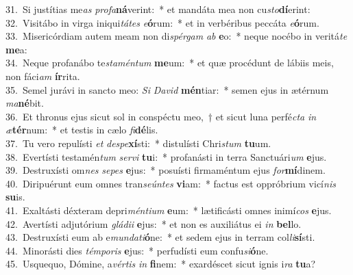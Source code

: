 {31.~}Si justítias me\textit{as} \textit{pro}\textit{fa}\textbf{ná}verint:~* et mandáta mea non cu\textit{sto}\textbf{dí}erint:\\
{32.~}Visitábo in virga iniqui\textit{tá}\textit{tes} \textit{e}\textbf{ó}rum:~* et in verbéribus peccáta \textit{e}\textbf{ó}rum.\\
{33.~}Misericórdiam autem meam non di\textit{spér}\textit{gam} \textit{ab} \textbf{e}o:~* neque nocébo in veritá\textit{te} \textbf{me}a:\\
{34.~}Neque profanábo te\textit{sta}\textit{mén}\textit{tum} \textbf{me}um:~* et quæ procédunt de lábiis meis, non fáci\textit{am} \textbf{ír}rita.\\
{35.~}Semel jurávi in sancto meo: \textit{Si} \textit{Da}\textit{vid} \textbf{mén}tiar:~* semen ejus in ætérnum \textit{ma}\textbf{né}bit.\\
{36.~}Et thronus ejus sicut sol in conspéctu meo,~† et sicut luna perfé\textit{cta} \textit{in} \textit{æ}\textbf{tér}num:~* et testis in cælo \textit{fi}\textbf{dé}lis.\\
{37.~}Tu vero repulísti \textit{et} \textit{de}\textit{spe}\textbf{xí}sti:~* distulísti Chri\textit{stum} \textbf{tu}um.\\
{38.~}Evertísti testamén\textit{tum} \textit{ser}\textit{vi} \textbf{tu}i:~* profanásti in terra Sanctuári\textit{um} \textbf{e}jus.\\
{39.~}Destruxísti om\textit{nes} \textit{se}\textit{pes} \textbf{e}jus:~* posuísti firmaméntum ejus \textit{for}\textbf{mí}dinem.\\
{40.~}Diripuérunt eum omnes tran\textit{se}\textit{ún}\textit{tes} \textbf{vi}am:~* factus est oppróbrium vicí\textit{nis} \textbf{su}is.\\
{41.~}Exaltásti déxteram depri\textit{mén}\textit{ti}\textit{um} \textbf{e}um:~* lætificásti omnes inimí\textit{cos} \textbf{e}jus.\\
{42.~}Avertísti adjutórium \textit{glá}\textit{di}\textit{i} \textbf{e}jus:~* et non es auxiliátus ei \textit{in} \textbf{bel}lo.\\
{43.~}Destruxísti eum ab e\textit{mun}\textit{da}\textit{ti}\textbf{ó}ne:~* et sedem ejus in terram col\textit{li}\textbf{sí}sti.\\
{44.~}Minorásti dies \textit{tém}\textit{po}\textit{ris} \textbf{e}jus:~* perfudísti eum confu\textit{si}\textbf{ó}ne.\\
{45.~}Usquequo, Dómine, a\textit{vér}\textit{tis} \textit{in} \textbf{fi}nem:~* exardéscet sicut ignis i\textit{ra} \textbf{tu}a?\\
